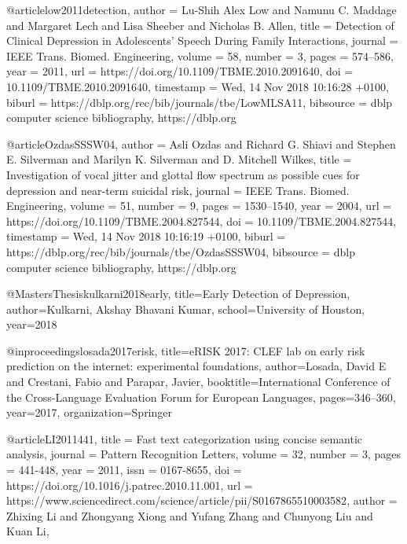 @article{low2011detection,
	author    = {Lu{-}Shih Alex Low and
	Namunu C. Maddage and
	Margaret Lech and
	Lisa Sheeber and
	Nicholas B. Allen},
	title     = {Detection of Clinical Depression in Adolescents' Speech During Family
	Interactions},
	journal   = {{IEEE} Trans. Biomed. Engineering},
	volume    = {58},
	number    = {3},
	pages     = {574--586},
	year      = {2011},
	url       = {https://doi.org/10.1109/TBME.2010.2091640},
	doi       = {10.1109/TBME.2010.2091640},
	timestamp = {Wed, 14 Nov 2018 10:16:28 +0100},
	biburl    = {https://dblp.org/rec/bib/journals/tbe/LowMLSA11},
	bibsource = {dblp computer science bibliography, https://dblp.org}
}

@article{OzdasSSSW04,
	author    = {Asli Ozdas and
	Richard G. Shiavi and
	Stephen E. Silverman and
	Marilyn K. Silverman and
	D. Mitchell Wilkes},
	title     = {Investigation of vocal jitter and glottal flow spectrum as possible
	cues for depression and near-term suicidal risk},
	journal   = {{IEEE} Trans. Biomed. Engineering},
	volume    = {51},
	number    = {9},
	pages     = {1530--1540},
	year      = {2004},
	url       = {https://doi.org/10.1109/TBME.2004.827544},
	doi       = {10.1109/TBME.2004.827544},
	timestamp = {Wed, 14 Nov 2018 10:16:19 +0100},
	biburl    = {https://dblp.org/rec/bib/journals/tbe/OzdasSSSW04},
	bibsource = {dblp computer science bibliography, https://dblp.org}
}

@MastersThesis{kulkarni2018early,
	title={Early Detection of Depression},
   author={Kulkarni, Akshay Bhavani Kumar},
   school={University of Houston},
	year={2018}
}

@inproceedings{losada2017erisk,
  title={eRISK 2017: CLEF lab on early risk prediction on the internet: experimental foundations},
  author={Losada, David E and Crestani, Fabio and Parapar, Javier},
  booktitle={International Conference of the Cross-Language Evaluation Forum for European Languages},
  pages={346--360},
  year={2017},
  organization={Springer}
}

@article{LI2011441,
title = {Fast text categorization using concise semantic analysis},
journal = {Pattern Recognition Letters},
volume = {32},
number = {3},
pages = {441-448},
year = {2011},
issn = {0167-8655},
doi = {https://doi.org/10.1016/j.patrec.2010.11.001},
url = {https://www.sciencedirect.com/science/article/pii/S0167865510003582},
author = {Zhixing Li and Zhongyang Xiong and Yufang Zhang and Chunyong Liu and Kuan Li},
}

